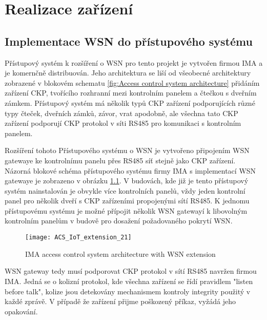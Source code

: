 \chapter{Realizace zařízení}

\section{Implementace WSN do přístupového systému}
Přístupový systém k rozšíření o WSN pro tento projekt je vytvořen firmou IMA a je komernčně distribuován. Jeho architektura se liší od všeobecné architektury zobrazené v blokovém schematu \ref{fig:Access control system architecture} přidáním zařízení CKP, tvořícího rozhranní mezi kontrolním panelem a čtečkou s dveřním zámkem. Přístupový systém má několik typů CKP zařízení podporujících různé typy čteček, dveřních zámků, závor, vrat apodobně, ale všechna tato CKP zařízení podporují CKP protokol v síti RS485 pro komunikaci s kontrolním panelem.

Rozšíření tohoto Přístupového systému o WSN je vytvořeno připojením WSN gatewaye ke kontrolnímu panelu přes RS485 síť stejně jako CKP zařízení. Názorná blokové schéma přístupového systému firmy IMA s implementací WSN gatewaye je zobrazeno v obrázku \ref{fig:ACS architecture IMA with geteway}.
V budovách, kde již je tento přístupový systém nainstalován je obvykle více kontrolních panelů, vždy jeden kontrolní panel pro několik dveří s CKP zařízeními propojenými sítí RS485. 
K jednomu přístupovému systému je možné přípojit několik WSN gatewayí k libovolným kontrolním panelům v budově pro dosažení požadovaného pokrytí WSN.

\begin{figure}[!h]
\centering
\texttt{[image: ACS\_IoT\_extension\_21]}
\caption{IMA access control system architecture with WSN extension}
\label{fig:ACS architecture IMA with geteway}
\end{figure}


WSN gateway tedy musí podporovat CKP protokol v sítí RS485 navržen firmou IMA. Jedná se o kolizní protokol, kde všechna zařízení se řídí pravidlem "listen before talk", kolize jsou detekovány 
mechanismem kontroly integrity použitý v každé zprávě. V případě že zařízení přijme poškozený příkaz, vyžádá jeho opakování.

